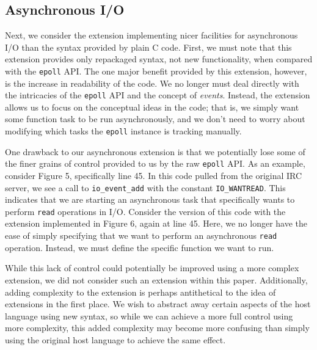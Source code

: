 \documentclass[main.tex]{subfiles}
\begin{document}
\subsection{Asynchronous I/O}
Next, we consider the extension implementing nicer facilities for asynchronous I/O than the syntax provided by plain C code.
First, we must note that this extension provides only repackaged syntax, not new functionality, when compared with the
\verb|epoll| API. The one major benefit provided by this extension, however, is the increase in readability of the code. We no
longer must deal directly with the intricacies of the \verb|epoll| API and the concept of \emph{events}. Instead, the extension
allows us to focus on the conceptual ideas in the code; that is, we simply want some function task to be run asynchronously,
and we don't need to worry about modifying which tasks the \verb|epoll| instance is tracking manually.

One drawback to our asynchronous extension is that we potentially lose some of the finer grains of control provided to us
by the raw \verb|epoll| API. As an example, consider Figure 5, specifically line 45. In this code pulled from the original IRC server, we see
a call to \verb|io_event_add| with the constant \verb|IO_WANTREAD|. This indicates that we are starting an asynchronous task that specifically
wants to perform \verb|read| operations in I/O. Consider the version of this code with the extension implemented in Figure 6, again at line
45. Here, we no longer have the ease of simply specifying that we want to perform an asynchronous \verb|read| operation. Instead, we must
define the specific function we want to run.

While this lack of control could potentially be improved using a more complex extension, we did
not consider such an extension within this paper. Additionally, adding complexity to the extension is perhaps antithetical to the
idea of extensions in the first place. We wish to abstract away certain aspects of the host language using new syntax,
so while we can achieve a more full control using more complexity, this added complexity may become more confusing than
simply using the original host language to achieve the same effect.
\end{document}
